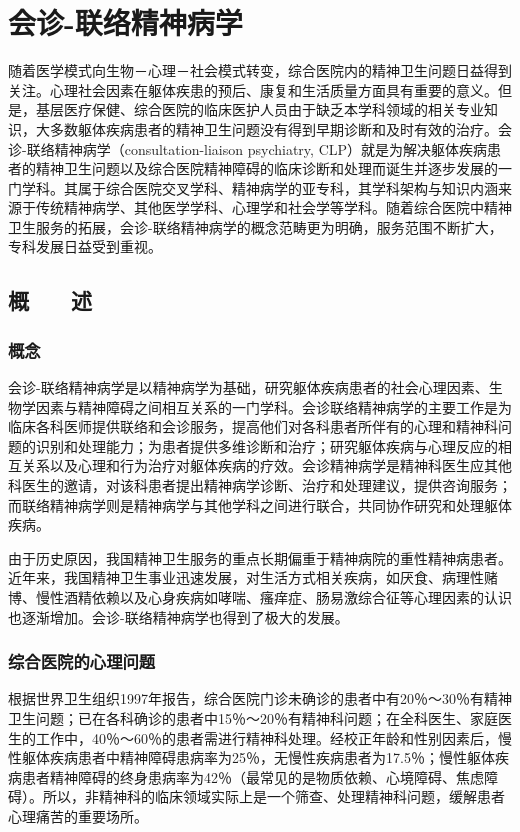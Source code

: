 \chapter{会诊-联络精神病学}

随着医学模式向生物－心理－社会模式转变，综合医院内的精神卫生问题日益得到关注。心理社会因素在躯体疾患的预后、康复和生活质量方面具有重要的意义。但是，基层医疗保健、综合医院的临床医护人员由于缺乏本学科领域的相关专业知识，大多数躯体疾病患者的精神卫生问题没有得到早期诊断和及时有效的治疗。会诊-联络精神病学（consultation-liaison
psychiatry,
CLP）就是为解决躯体疾病患者的精神卫生问题以及综合医院精神障碍的临床诊断和处理而诞生并逐步发展的一门学科。其属于综合医院交叉学科、精神病学的亚专科，其学科架构与知识内涵来源于传统精神病学、其他医学学科、心理学和社会学等学科。随着综合医院中精神卫生服务的拓展，会诊-联络精神病学的概念范畴更为明确，服务范围不断扩大，专科发展日益受到重视。

\section{概　　述}

\subsection{概念}

会诊-联络精神病学是以精神病学为基础，研究躯体疾病患者的社会心理因素、生物学因素与精神障碍之间相互关系的一门学科。会诊联络精神病学的主要工作是为临床各科医师提供联络和会诊服务，提高他们对各科患者所伴有的心理和精神科问题的识别和处理能力；为患者提供多维诊断和治疗；研究躯体疾病与心理反应的相互关系以及心理和行为治疗对躯体疾病的疗效。会诊精神病学是精神科医生应其他科医生的邀请，对该科患者提出精神病学诊断、治疗和处理建议，提供咨询服务；而联络精神病学则是精神病学与其他学科之间进行联合，共同协作研究和处理躯体疾病。

由于历史原因，我国精神卫生服务的重点长期偏重于精神病院的重性精神病患者。近年来，我国精神卫生事业迅速发展，对生活方式相关疾病，如厌食、病理性赌博、慢性酒精依赖以及心身疾病如哮喘、瘙痒症、肠易激综合征等心理因素的认识也逐渐增加。会诊-联络精神病学也得到了极大的发展。

\subsection{综合医院的心理问题}

根据世界卫生组织1997年报告，综合医院门诊未确诊的患者中有20％～30％有精神卫生问题；已在各科确诊的患者中15％～20％有精神科问题；在全科医生、家庭医生的工作中，40％～60％的患者需进行精神科处理。经校正年龄和性别因素后，慢性躯体疾病患者中精神障碍患病率为25％，无慢性疾病患者为17.5％；慢性躯体疾病患者精神障碍的终身患病率为42％（最常见的是物质依赖、心境障碍、焦虑障碍）。所以，非精神科的临床领域实际上是一个筛查、处理精神科问题，缓解患者心理痛苦的重要场所。

